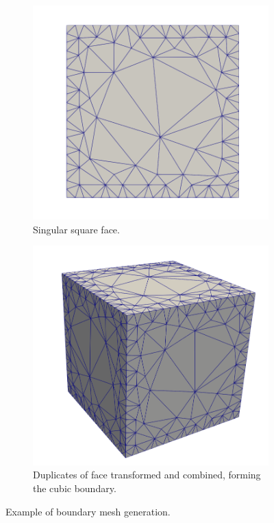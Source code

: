 \documentclass[12pt, letterpaper]{article}
\begin{document}
\begin{figure}[ht!]
	\begin{subfigure}{0.4\textwidth}
		\includegraphics[width=\linewidth]{boundaryGen/square.png}
		\caption{Singular square face.}
	\end{subfigure}
	\hspace*{\fill}	
	\begin{subfigure}{0.4\textwidth}
		\includegraphics[width=\linewidth]{boundaryGen/cube.png}
		\caption{Duplicates of face transformed and combined, forming the cubic boundary.}
	\end{subfigure}	
	\caption{Example of boundary mesh generation.}
	\label{boundaryGenerationExample}
\end{figure}
\end{document}
